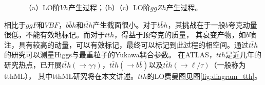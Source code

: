 \begin{figure}[h]
\begin{subfigure}[b]{0.33\textwidth}
  \caption{}
  \label{fig:diagram_ggzh1}
 \end{subfigure}
\caption{（a）LO阶$Vh$产生过程；（b）（c）LO阶$ggZh$产生过程。}
\label{fig:Vh_ggZh}
\end{figure}

相比于$ggF$和$VBF$，$b\bar{b}h$和$t\bar{t}h$产生截面很小。对于$b\bar{b}h$，其挑战在于一般$b$夸克动量很低，不能有效地标记。而对于$t\bar{t}h$，得益于顶夸克的质量，
其衰变产物，如$b$喷注，具有较高的动量，可以有效标记，最终可以标记到此过程的相空间。通过$t\bar{t}h$的研究可以测量Higgs与最重粒子的Yukawa耦合参数。
在ATLAS，$t\bar{t}h$是近几年的研究热点，已开展$t\bar{t}h(\rightarrow\gamma\gamma)$，$t\bar{t}h(\rightarrow b\bar{b})$以及$t\bar{t}h(\rightarrow \ell/\tau)$（一般称为tthML），
其中tthML研究将在本文讲述。$t\bar{t}h$的LO费曼图见图\ref{fig:diagram_tth}。\\
